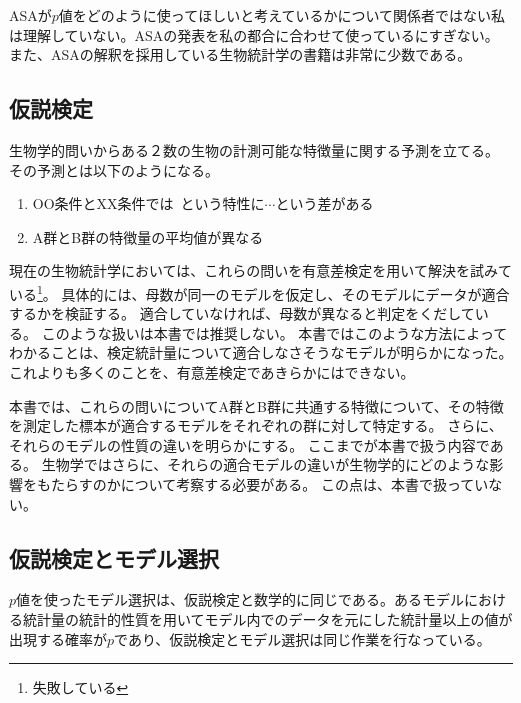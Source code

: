 
ASAが$p$値をどのように使ってほしいと考えているかについて関係者ではない私は理解していない。ASAの発表を私の都合に合わせて使っているにすぎない。
また、ASAの解釈を採用している生物統計学の書籍は非常に少数である。

\subsection{仮説検定}
生物学的問いからある２数の生物の計測可能な特徴量に関する予測を立てる。
その予測とは以下のようになる。
\begin{enumerate}
 \item OO条件とXX条件では~という特性に$\cdots$という差がある
 \item A群とB群の特徴量の平均値が異なる
\end{enumerate}
現在の生物統計学においては、これらの問いを有意差検定を用いて解決を試みている\footnote{失敗している}。
具体的には、母数が同一のモデルを仮定し、そのモデルにデータが適合するかを検証する。
適合していなければ、母数が異なると判定をくだしている。
このような扱いは本書では推奨しない。
本書ではこのような方法によってわかることは、検定統計量について適合しなさそうなモデルが明らかになった。
これよりも多くのことを、有意差検定であきらかにはできない。

本書では、これらの問いについてA群とB群に共通する特徴について、その特徴を測定した標本が適合するモデルをそれぞれの群に対して特定する。
さらに、それらのモデルの性質の違いを明らかにする。
ここまでが本書で扱う内容である。
生物学ではさらに、それらの適合モデルの違いが生物学的にどのような影響をもたらすのかについて考察する必要がある。
この点は、本書で扱っていない。


\subsection{仮説検定とモデル選択}
$p$値を使ったモデル選択は、仮説検定と数学的に同じである。あるモデルにおける統計量の統計的性質を用いてモデル内でのデータを元にした統計量以上の値が出現する確率が$p$であり、仮説検定とモデル選択は同じ作業を行なっている。

